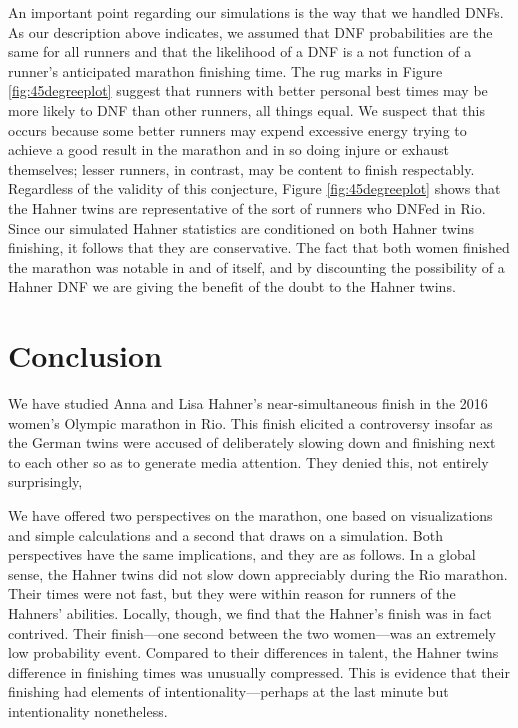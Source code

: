 \documentclass[12pt,titlepage]{article}
\begin{document}
An important point regarding our simulations is the way that we
handled DNFs. As our description above indicates, we assumed that DNF
probabilities are the same for all runners and that the likelihood of
a DNF is a not function of a runner's anticipated marathon finishing
time. The rug marks in Figure \ref{fig:45degreeplot} suggest that
runners with better personal best times may be more likely to DNF than
other runners, all things equal. We suspect that this occurs because
some better runners may expend excessive energy trying to achieve a
good result in the marathon and in so doing injure or exhaust
themselves; lesser runners, in contrast, may be content to finish
respectably. Regardless of the validity of this conjecture, Figure
\ref{fig:45degreeplot} shows that the Hahner twins are representative
of the sort of runners who DNFed in Rio. Since our simulated Hahner
statistics are conditioned on both Hahner twins finishing, it follows
that they are conservative. The fact that both women finished the
marathon was notable in and of itself, and by discounting the
possibility of a Hahner DNF we are giving the benefit of the doubt to
the Hahner twins.

\section*{Conclusion}

We have studied Anna and Lisa Hahner's near-simultaneous finish in the
2016 women's Olympic marathon in Rio. This finish elicited a
controversy insofar as the German twins were accused of deliberately
slowing down and finishing next to each other so as to generate media
attention. They denied this, not entirely surprisingly,

We have offered two perspectives on the marathon, one based on
visualizations and simple calculations and a second that draws on a
simulation. Both perspectives have the same implications, and they are
as follows. In a global sense, the Hahner twins did not slow down
appreciably during the Rio marathon. Their times were not fast, but
they were within reason for runners of the Hahners' abilities.
Locally, though, we find that the Hahner's finish was in fact
contrived. Their finish---one second between the two women---was an
extremely low probability event. Compared to their differences in
talent, the Hahner twins difference in finishing times was unusually
compressed. This is evidence that their finishing had elements of
intentionality---perhaps at the last minute but intentionality
nonetheless.
\end{document}
